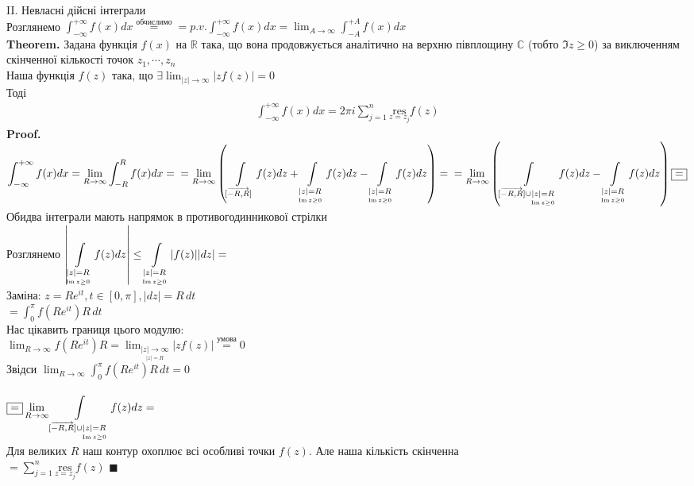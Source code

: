 \documentclass[a4paper, 10pt]{article}
\def\residue#1#2{\underset{z = {#1}}{\textrm{res}} {#2}}
\def\hugespace{\vspace{5mm} \\}
\theoremstyle{theoremdd}
\theoremstyle{theoremdd}
\theoremstyle{theoremdd}
\theoremstyle{theoremdd}
\theoremstyle{theoremdd}
\theoremstyle{theoremdd}
\theoremstyle{theoremdd}
\theoremstyle{theoremdd}
\begin{document}
II. Невласні дійсні інтеграли\\
Розглянемо $\displaystyle \int_{-\infty}^{+\infty} f(x) dx \overset{\textrm{обчислимо}}{=} = p.v. \int_{-\infty}^{+\infty} f(x) dx = \lim_{A \to \infty} \int_{-A}^{+A} f(x) dx$
\hugespace
\textbf{Theorem.} Задана функція $f(x)$ на $\mathbb{R}$ така, що вона продовжується аналітично на верхню півплощину $\mathbb{C}$ (тобто $\Im z \geq 0$) за виключенням скінченної кількості точок $z_1, \cdots, z_n$\\
Наша функція $f(z)$ така, що $\displaystyle \exists \lim_{|z| \to \infty} |z f(z)| = 0$\\
Тоді \begin{align*}
\int_{-\infty}^{+\infty} f(x) dx = 2 \pi i \sum_{j=1}^n \residue{z_j}{f(z)}
\end{align*}
\textbf{Proof.}\\
$\displaystyle \int_{-\infty}^{+\infty} f(x) dx = \displaystyle \lim_{R \to \infty} \int_{-R}^{R} f(x) dx = \\
= \lim_{R \to \infty} \left(\int\displaylimits_{[\overrightarrow{-R,R}]} f(z)dz + \int\displaylimits_{\underset{\Im z \geq 0}{|z|=R}} f(z)dz - \int\displaylimits_{ \underset{\Im z \geq 0}{|z|=R}} f(z)dz \right) = \\ =
\lim_{R \to \infty} \left(\int\displaylimits_{[\overrightarrow{-R,R}] \cup \underset{\Im z \geq 0}{|z|=R}} f(z)dz - \int\displaylimits_{ \underset{\Im z \geq 0}{|z|=R}} f(z)dz \right) \boxed{=}
$\\
Обидва інтеграли мають напрямок в противогодинникової стрілки\\
Розглянемо $\displaystyle \abs{\int\displaylimits_{ \underset{\Im z \geq 0}{|z|=R}} f(z)dz} \leq \int\displaylimits_{ \underset{\Im z \geq 0}{|z|=R}} \abs{f(z)}\abs{dz} = $\\
Заміна: $z = Re^{it}, t \in [0, \pi], |dz| = R\,dt$\\
$\displaystyle = \int_0^\pi f(Re^{it}) R\,dt$\\
Нас цікавить границя цього модулю:\\
$\displaystyle \lim_{R \to \infty} f(Re^{it})R = \lim_{\underset{|z|=R}{|z| \to \infty}} |z f(z)| \overset{\textrm{умова}}{=} 0$\\
Звідси $\displaystyle \lim_{R \to \infty} \int_0^\pi f(Re^{it}) R\,dt = 0$\\
\\
$\displaystyle \boxed{=}  \lim_{R \to \infty} \int\displaylimits_{[\overrightarrow{-R,R}] \cup \underset{\Im z \geq 0}{|z|=R}} f(z)dz = $\\
Для великих $R$ наш контур охоплює всі особливі точки $f(z)$. Але наша кількість скінченна\\
$\displaystyle = \sum_{j=1}^n \residue{z_j}{f(z)}$ $\blacksquare$
\hugespace
\end{document}
